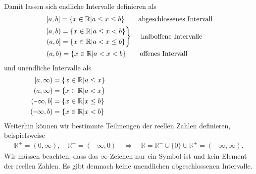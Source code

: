 Damit lassen sich endliche Intervalle definieren als 
\begin{align}
    \begin{split}
        &\;[a,b] = \{x \in\mathbb{R} | a \le x \le b\} \qquad \text{abgeschlossenes Intervall} \\
        &\begin{rcases}
            [a,b) = \{x \in\mathbb{R} | a \le x < b\} \\
            (a,b] = \{x \in\mathbb{R} | a < x \le b\}   
        \end{rcases} \quad\;\text{halboffene Intervalle} \\
        &\;(a,b) = \{x \in\mathbb{R} | a < x < b\} \qquad \text{offenes Intervall} \\
    \end{split}
\end{align}
und unendliche Intervalle als 
\begin{align}
    \begin{split}
        [a,\infty) &= \{x\in\mathbb{R}| a \le x\} \hspace{6.2cm}\\
        (a,\infty) &= \{x\in\mathbb{R}| a < x\} \\
        (\minus\infty,b] &= \{x\in\mathbb{R}| x \le b\} \\
        (\minus\infty,b) &= \{x\in\mathbb{R}| x < b\}
    \end{split}
\end{align}
Weiterhin können wir bestimmte Teilmengen der reellen Zahlen definieren, beispielsweise 
\begin{align}
    \mathbb{R}^+ = (0,\infty), \quad \mathbb{R}^- = (\minus\infty,0) \quad \Rightarrow \quad \mathbb{R} = \mathbb{R}^- \cup \{0\} \cup \mathbb{R}^+ = (\minus\infty,\infty).
\end{align}
Wir müssen beachten, dass das $\infty$-Zeichen nur ein Symbol ist und kein Element der reellen Zahlen. Es gibt demnach keine unendlichen abgeschlossenen Intervalle.

